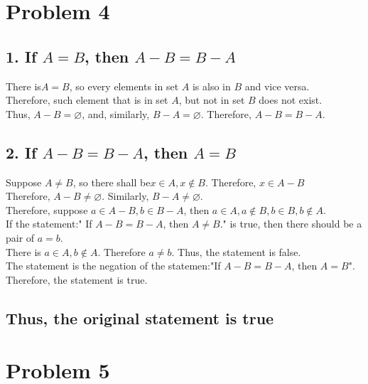 \documentclass{article}
\begin{document}
\section*{Problem 4}
\subsection*{1. If \(A = B\), then \(A-B=B-A\)}
        There is\(A=B\), so every elements in set \(A\) is also in \(B\) and vice versa.\\
        Therefore, such element that is in set \(A\), but not in set \(B\) does not exist.\\
        Thus, \(A-B=\varnothing\), and, similarly, \(B-A = \varnothing\). 
        Therefore, \(A-B = B-A\).\\
\subsection*{2. If \(A-B=B-A\), then \(A = B\)}
        Suppose \(A\neq B\), so there shall be\(x \in A, x\notin B\). Therefore, \(x\in A-B\)\\
        Therefore, \(A-B \neq \varnothing\). Similarly, \(B-A \neq \varnothing\).\\
        Therefore, suppose \(a \in A-B, b \in B-A\), then \(a \in A, a\notin B, b\in B, b\notin A\).\\
        If the statement:" If \(A-B=B-A\), then \(A\neq B\)." is true, then there should be a pair of \(a=b\).\\
        There is \(a \in A, b \notin A\). Therefore \(a\neq b\). Thus, the statement is false.\\
        The statement is the negation of the statemen:"If \(A-B=B-A\), then \(A = B\)".\\
        Therefore, the statement is true.
\subsection*{Thus, the original statement is true}

\section*{Problem 5}
\end{document}
